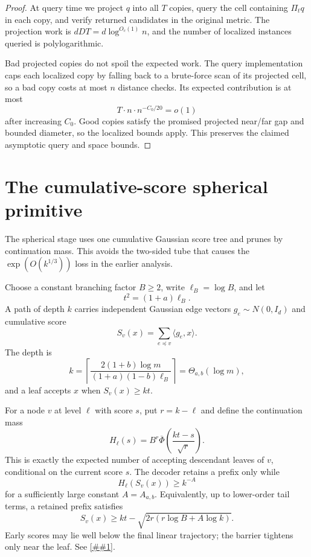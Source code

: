 \documentclass[10pt]{article}
\newcommand{\cref}[1]{\ref{##1}}
\theoremstyle{definition}
\newcommand{\ip}[2]{\langle #1,#2\rangle}
\begin{document}
\begin{proof}
   At query time we project $q$ into all $T$ copies, query the cell containing $\Pi_tq$ in each copy, and verify returned candidates in the original metric. The projection work is $dD T=d\log^{O_c(1)}n$, and the number of localized instances queried is polylogarithmic.

   Bad projected copies do not spoil the expected work. The query implementation caps each localized copy by falling back to a brute-force scan of its projected cell, so a bad copy costs at most $n$ distance checks. Its expected contribution is at most
   \[
      T\cdot n\cdot n^{-C_0/20}=o(1)
   \]
   after increasing $C_0$. Good copies satisfy the promised projected near/far gap and bounded diameter, so the localized bounds apply. This preserves the claimed asymptotic query and space bounds.
\end{proof}

\section{The cumulative-score spherical primitive}

The spherical stage uses one cumulative Gaussian score tree and prunes by continuation mass. This avoids the two-sided tube that causes the $\exp(O(k^{1/3}))$ loss in the earlier analysis.

Choose a constant branching factor $B\ge2$, write $\ell_B=\log B$, and let
\[
   t^2=(1+a)\ell_B.
\]
A path of depth $k$ carries independent Gaussian edge vectors $g_e\sim N(0,I_d)$ and cumulative score
\[
   S_v(x)=\sum_{e\preceq v}\ip{g_e}{x}.
\]
The depth is
\[
   k
   =
   \left\lceil
      \frac{2(1+b)\log m}
      {(1+a)(1-b)\ell_B}
   \right\rceil
   =
   \Theta_{a,b}(\log m),
\]
and a leaf accepts $x$ when $S_v(x)\ge kt$.

For a node $v$ at level $\ell$ with score $s$, put $r=k-\ell$ and define the continuation mass
\[
   H_\ell(s)
   =
   B^r
   \overline\Phi\!\left(\frac{kt-s}{\sqrt r}\right).
\]
This is exactly the expected number of accepting descendant leaves of $v$, conditional on the current score $s$. The decoder retains a prefix only while
\[
   H_\ell(S_v(x))\ge k^{-A}
\]
for a sufficiently large constant $A=A_{a,b}$. Equivalently, up to lower-order tail terms, a retained prefix satisfies
\[
   S_v(x)\ge
   kt-\sqrt{2r(r\log B+A\log k)}.
\]
Early scores may lie well below the final linear trajectory; the barrier tightens only near the leaf. See \cref{fig:barrier}.
\end{document}
